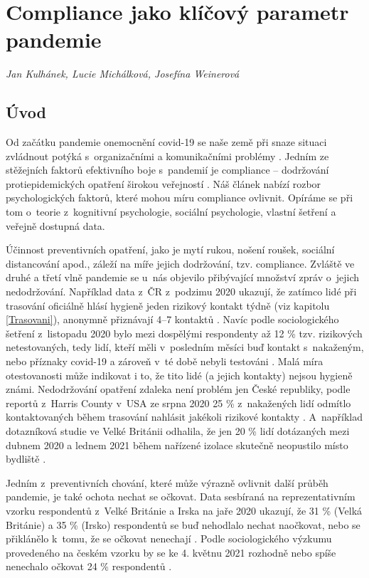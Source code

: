 \chapter{Compliance jako klíčový parametr pandemie}
\label{Compliance}

\textit{Jan Kulhánek, Lucie Michálková, Josefína Weinerová}
\vspace{15mm}

\section*{Úvod} 

Od začátku pandemie onemocnění covid-19 se naše země při snaze situaci zvládnout potýká s~organizačními a komunikačními problémy \cite{CeskaTiskovaKancelar2020,Vlckova2020}. Jedním ze stěžejních faktorů efektivního boje s~pandemií je compliance -- dodržování protiepidemických opatření širokou veřejností \cite{VanRooij2020}. Náš článek nabízí rozbor psychologických faktorů, které mohou míru compliance ovlivnit. Opí\-rá\-me se při tom o~teorie z~kognitivní psychologie, sociální psychologie, vlastní šetření a veřejně dostupná data. 

Účinnost preventivních opatření, jako je mytí rukou, nošení roušek, sociální distancování apod., záleží na míře jejich dodržování, tzv. compliance. Zvláště ve druhé a třetí vlně pandemie se u~nás objevilo přibývající množství zpráv o~jejich nedodržování. Například data z~ČR z~podzimu 2020 ukazují, že zatímco lidé při trasování oficiálně hlásí hygieně jeden rizikový kontakt týdně (viz kapitolu \ref{Trasovani}), anonymně přiznávají 4--7 kontaktů \cite{tr_PAQ01}. Navíc podle sociologického šetření  z~listopadu 2020 bylo mezi dospělými respondenty až 12 \% tzv. rizikových netestovaných, tedy lidí, kteří měli v~posledním měsíci buď kontakt s~nakaženým, nebo příznaky covid-19 a zároveň v~té době nebyli testováni \cite{Prokop2020a}. Malá míra otestovanosti může indikovat i to, že tito lidé (a jejich kontakty) nejsou hygieně známi. Nedodržování opatření zdaleka není problém jen České republiky, podle reportů z~Harris County v~USA ze srpna 2020 25 \% z~nakažených lidí odmítlo kontaktovaných během trasování nahlásit jakékoli rizikové kontakty \cite{Shapiro2020}. A~například dotazníková studie ve Velké Británii odhalila, že jen 20 \% lidí dotázaných mezi dubnem 2020 a lednem 2021 během nařízené izolace skutečně neopustilo místo bydliště \cite{Smith2021}.

Jedním z~preventivních chování, které může výrazně ovlivnit další průběh pandemie, je také ochota nechat se očkovat. Data sesbíraná na reprezentativním vzorku respondentů z~Velké Británie a Irska na jaře 2020 ukazují, že 31 \% (Velká Británie) a 35 \% (Irsko) respondentů se buď nehodlalo nechat naočkovat, nebo se přiklánělo k~tomu, že se očkovat nenechají \cite{Murphy2021}. Podle sociologického výzkumu  provedeného na českém vzorku by se ke 4. květnu 2021 rozhodně nebo spíše nenechalo očkovat 24 \% respondentů \cite{Prokop2021}.

